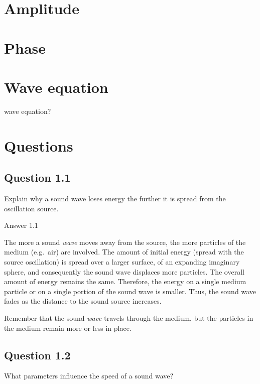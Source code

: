 \documentclass[
]{book}
\begin{document}
\section{Amplitude}\label{amplitude}

\section{Phase}\label{phase}

\section{Wave equation}\label{wave-equation}

wave equation?

\label{questions-soundwaves}
\section{Questions}\label{questions-1}

\subsection*{Question 1.1}\label{question-1.1}

Explain why a sound wave loses energy the further it is spread from the oscillation source.

Answer 1.1

The more a sound \emph{wave} moves away from the source, the more particles of the medium (e.g.~air) are involved. The amount of initial energy (spread with the source oscillation) is spread over a larger surface, of an expanding imaginary sphere, and consequently the sound wave displaces more particles. The overall amount of energy remains the same. Therefore, the energy on a single medium particle or on a single portion of the sound wave is smaller. Thus, the sound wave fades as the distance to the sound source increases.

Remember that the sound \emph{wave} travels through the medium, but the particles in the medium remain more or less in place.

\subsection*{Question 1.2}\label{question-1.2}

What parameters influence the speed of a sound wave?
\end{document}
